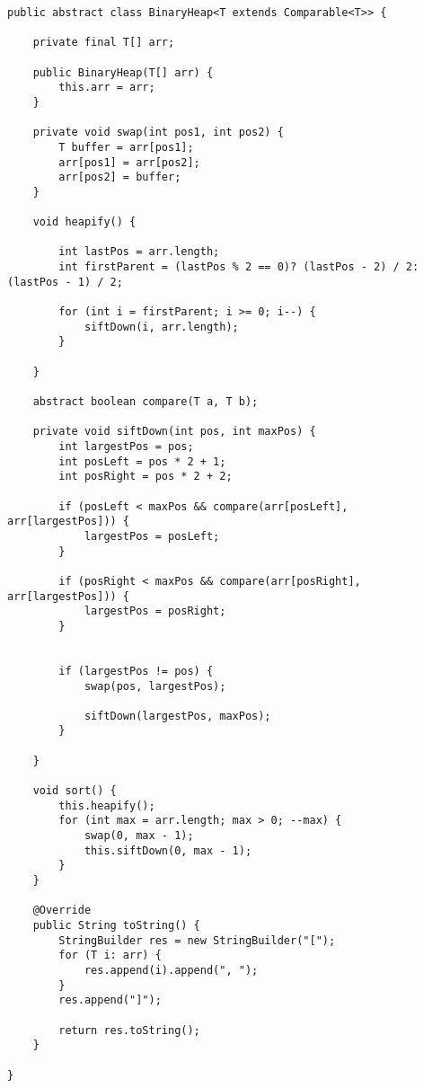 \documentclass[paper=a4, fontsize=11pt]{scrartcl} %
\numberwithin{equation}{section} %
\numberwithin{figure}{section} %
\numberwithin{table}{section} %
\begin{document}
\begin{lstlisting}



public abstract class BinaryHeap<T extends Comparable<T>> {

    private final T[] arr;

    public BinaryHeap(T[] arr) {
        this.arr = arr;
    }

    private void swap(int pos1, int pos2) {
        T buffer = arr[pos1];
        arr[pos1] = arr[pos2];
        arr[pos2] = buffer;
    }

    void heapify() {

        int lastPos = arr.length;
        int firstParent = (lastPos % 2 == 0)? (lastPos - 2) / 2: (lastPos - 1) / 2;

        for (int i = firstParent; i >= 0; i--) {
            siftDown(i, arr.length);
        }

    }

    abstract boolean compare(T a, T b);

    private void siftDown(int pos, int maxPos) {
        int largestPos = pos;
        int posLeft = pos * 2 + 1;
        int posRight = pos * 2 + 2;

        if (posLeft < maxPos && compare(arr[posLeft], arr[largestPos])) {
            largestPos = posLeft;
        }

        if (posRight < maxPos && compare(arr[posRight], arr[largestPos])) {
            largestPos = posRight;
        }


        if (largestPos != pos) {
            swap(pos, largestPos);

            siftDown(largestPos, maxPos);
        }

    }

    void sort() {
        this.heapify();
        for (int max = arr.length; max > 0; --max) {
            swap(0, max - 1);
            this.siftDown(0, max - 1);
        }
    }

    @Override
    public String toString() {
        StringBuilder res = new StringBuilder("[");
        for (T i: arr) {
            res.append(i).append(", ");
        }
        res.append("]");

        return res.toString();
    }

}


\end{lstlisting}





\end{document}
